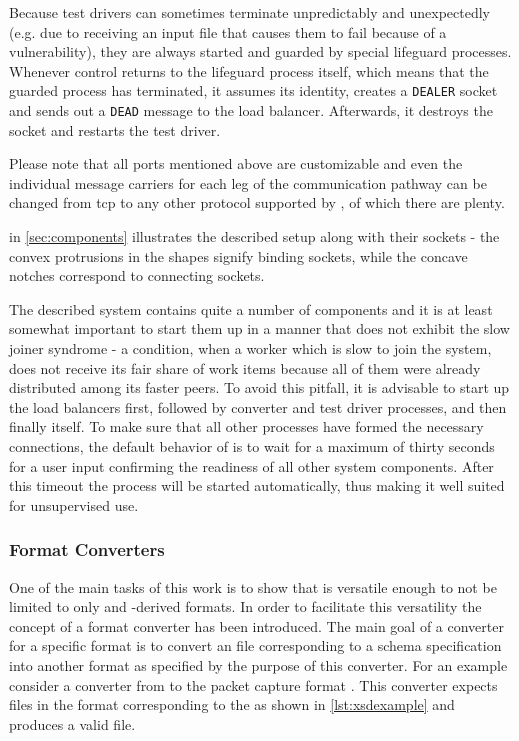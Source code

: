 Because test drivers can sometimes terminate unpredictably and unexpectedly (e.g. due to receiving an input
file that causes them to fail because of a vulnerability), they are always started and guarded by special
lifeguard processes. Whenever control returns to the lifeguard process itself, which means that the guarded
process has terminated, it assumes its identity, creates a \texttt{DEALER} socket and sends out a \texttt{DEAD}
message to the load balancer. Afterwards, it destroys the socket and restarts the test driver.

Please note that all ports mentioned above are customizable and even the individual message carriers for
each leg of the communication pathway can be changed from tcp to any other protocol supported by \zmq, of which
there are plenty.

 in \cref{sec:components} illustrates the described setup along with their 
\zmq sockets - the convex protrusions in the shapes signify binding sockets, while the concave notches
correspond to connecting sockets.

The described system contains quite a number of components and it is at least somewhat important to start them
up in a manner that does not exhibit the slow joiner syndrome - a condition, when a worker which is slow to
join the system, does not receive its fair share of work items because all of them were already distributed
among its faster peers. To avoid this pitfall, it is advisable to start up the load balancers first, followed
by converter and test driver processes, and then finally \xmlmate itself. To make sure that all other
processes have formed the necessary connections, the default behavior of \xmlmate is to wait for a maximum of
thirty seconds for a user input confirming the readiness of all other system components. After this timeout the
process will be started automatically, thus making it well suited for unsupervised use.

\subsubsection{Format Converters}
One of the main tasks of this work is to show that \xmlmate is versatile enough to not be limited to 
only \xml and \xml-derived formats. In order to facilitate this versatility the concept of a format 
converter has been introduced. The main goal of a converter for a specific format is to convert an 
\xml file corresponding to a schema specification into another format as specified by the purpose 
of this converter. For an example consider a converter from \xml to the packet capture format \pcap. 
This converter expects \xml files in the format corresponding to the \pcap{} \xsd as shown in
\cref{lst:xsdexample} and produces a valid \pcap file. 

